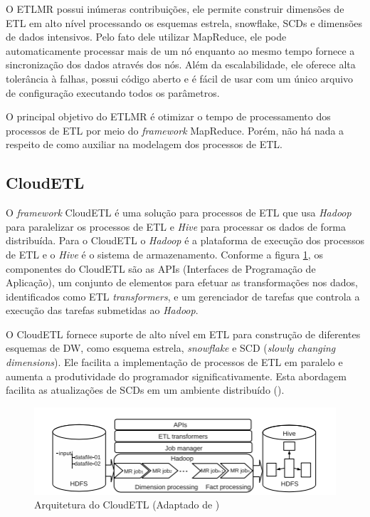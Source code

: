 O ETLMR possui inúmeras contribuições, ele permite construir dimensões de ETL em alto nível processando os esquemas estrela, snowflake, SCDs e dimensões de dados intensivos. Pelo fato dele utilizar MapReduce, ele pode automaticamente processar mais de um nó enquanto ao mesmo tempo fornece a sincronização dos dados através dos nós. Além da escalabilidade, ele oferece alta tolerância à falhas, possui código aberto e é fácil de usar com um único arquivo de configuração executando todos os parâmetros.

O principal objetivo do ETLMR é otimizar o tempo de processamento dos processos de ETL por meio do \textit{framework} MapReduce. Porém, não há nada a respeito de como auxiliar na modelagem dos processos de ETL.

\subsection{CloudETL}

O \textit{framework} CloudETL é uma solução para processos de ETL que usa \textit{Hadoop} para paralelizar os processos de ETL e \textit{Hive} para processar os dados de forma distribuída. Para o CloudETL o \textit{Hadoop} é a plataforma de execução dos processos de ETL e o \textit{Hive} é o sistema de armazenamento. Conforme a figura \ref{cloudetl}, os componentes do CloudETL são as APIs (Interfaces de Programação de Aplicação), um conjunto de elementos para efetuar as transformações nos dados, identificados como ETL \textit{transformers}, e um gerenciador de tarefas que controla a execução das tarefas submetidas ao \textit{Hadoop}. 

O CloudETL fornece suporte de alto nível em ETL para construção de diferentes esquemas de DW, como esquema estrela, \textit{snowflake} e SCD (\textit{slowly changing dimensions}). Ele facilita a implementação de processos de ETL em paralelo e aumenta a produtividade do programador significativamente. Esta abordagem facilita as atualizações de SCDs em um ambiente distribuído (\cite{liu:2013}).

\begin{figure}[h]
	\centering
	\includegraphics[scale=0.9]{fig/cloudetl.png}
	\caption{Arquitetura do CloudETL (Adaptado de \cite{liu:2013})}
	\label{cloudetl}
\end{figure}

